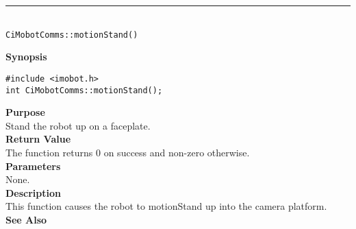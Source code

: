 \noindent
\vspace{5pt}
\rule{4.5in}{0.015in}\\
\noindent
{\LARGE \texttt{CiMobotComms::motionStand()}}\\
{}

\noindent
{\bf Synopsis}\\
\begin{verbatim}
#include <imobot.h>
int CiMobotComms::motionStand();
\end{verbatim}

\noindent
{\bf Purpose}\\
Stand the robot up on a faceplate.\\

\noindent
{\bf Return Value}\\
The function returns 0 on success and non-zero otherwise.\\

\noindent
{\bf Parameters}\\
None.\\

\noindent
{\bf Description}\\
This function causes the robot to motionStand up into the camera platform.\\

\noindent
{\bf See Also}\\

